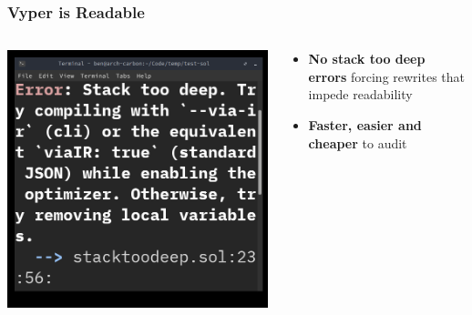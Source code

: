 \documentclass[aspectratio=169]{beamer}
\begin{document}
\begin{frame}
	\frametitle{Vyper is Readable}
	
	\begin{columns}[T,totalwidth=\textwidth]
		\begin{column}{0.4\textwidth}
			\centering
			\includegraphics[width=\textwidth]{assets/stacktoodeep.png}
		\end{column}
		
		\begin{column}{0.55\textwidth}
			\begin{itemize}
				\item \textbf{No stack too deep errors} forcing rewrites that impede readability
				\vspace{1em}
				\item \textbf{Faster, easier and cheaper} to audit
			\end{itemize}
		\end{column}
	\end{columns}
\end{frame}
\end{document}
